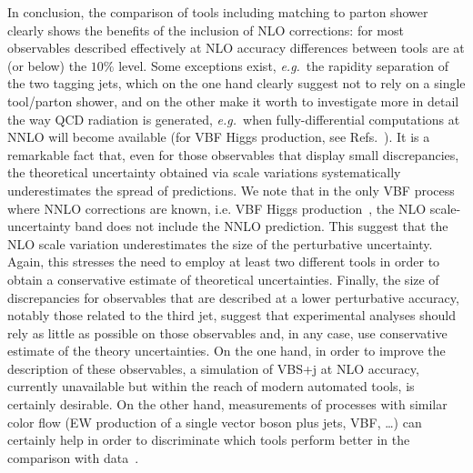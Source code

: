\documentclass[twocolumn,epjc3]{svjour3} %
\providecommand{\DIFaddtex}[1]{{\protect\color{blue}\uwave{#1}}} %
\providecommand{\DIFaddbegin}{} %
\providecommand{\DIFaddend}{} %
\providecommand{\DIFadd}[1]{\texorpdfstring{\DIFaddtex{#1}}{#1}} %
\begin{document}
In conclusion, the comparison of tools including matching to parton shower clearly shows the benefits of the inclusion of NLO corrections: for most observables described
effectively at NLO accuracy differences between tools are at (or below) the $10\%$ level.
Some exceptions exist, \emph{e.g.}\ the rapidity separation of the two tagging jets, which
on the one hand clearly suggest not to rely on a single tool/parton shower, and on the other make it worth to investigate more in detail the way QCD radiation is
generated, \emph{e.g.}\ when fully-differential computations at NNLO will become available (for VBF Higgs production, see Refs.~\cite{Cacciari:2015jma, Cruz-Martinez:2018rod}). It is a remarkable fact that, even for those observables that display small discrepancies,
the theoretical uncertainty obtained via scale variations \DIFaddbegin \DIFadd{(renormalization, factorization and shower scale) 
}\DIFaddend systematically underestimates the spread of predictions. We note 
that in the only VBF process where NNLO corrections are known, i.e. VBF Higgs production~\cite{Cacciari:2015jma, Cruz-Martinez:2018rod}, 
the NLO scale-uncertainty band does not include the NNLO prediction. This suggest that the NLO scale variation 
underestimates the size of the perturbative uncertainty. Again, this stresses the need
 to employ at least two different tools in order to obtain a conservative estimate of theoretical uncertainties. Finally, the size of discrepancies for observables that are described at a lower perturbative accuracy, notably those related to the third jet, suggest that
experimental analyses should rely as little as possible on those observables and, in any case, use conservative estimate of the theory
uncertainties. On the one hand, in order to improve the
description of these observables, a simulation of VBS+j at NLO accuracy, currently unavailable but within the reach of modern
automated tools, is certainly desirable.
On the other hand, measurements of processes with similar
color flow (EW production of a single vector boson plus jets,
VBF, \ldots) can certainly help in order to discriminate which tools perform better in the comparison with data~\cite{Aaboud:2017emo,Sirunyan:2017jej}.
\end{document}
